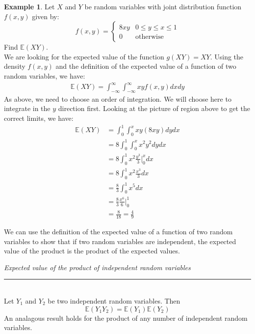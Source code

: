\documentclass[12pt]{article}
\theoremstyle{definition}
\newtheorem*{example}{Example}
\theoremstyle{remark}
\def\E{{\mathbb E}}
\begin{document}
\begin{example}
Let $X$ and $Y$ be random variables with joint distribution function $f(x, y)$ given by:
\[
f(x, y) = \begin{cases} 
      8 x y  & 0 \leq y \leq x \leq 1 \\
      0 & \textrm{otherwise}
   \end{cases}
\]
Find $\E(XY)$.\\

We are looking for the expected value of the function $g(XY) = XY$. Using the density $f(x, y)$ and the definition of the expected value of a function of two random variables, we have:
\begin{align*}
\E(XY) = \int_{-\infty}^\infty \int_{-\infty}^\infty x y f(x, y) dx dy
\end{align*}
As above, we need to choose an order of integration. We will choose here to integrate in the $y$ direction first. Looking at the picture of region above to get the correct limits, we have:
\begin{align*}
\E(XY) &= \int_0^1 \int_0^x x y (8 x y) dy dx \\
&= 8 \int_0^1 \int_0^x x^2 y^2 dy dx \\
&= 8 \int_0^1 x^2 \frac{y^3}{3}\Bigr|_0^x dx \\
&= 8 \int_0^1 x^2 \frac{x^3}{3} dx \\
&= \frac{8}{3} \int_0^1 x^5 dx \\
&= \frac{8}{3} \frac{x^6}{6} \Bigr|_0^1 \\
&= \frac{8}{18} = \frac{4}{9}
\end{align*}
\end{example}

We can use the definition of the expected value of a function of two random variables to show that if two random variables are independent, the expected value of the product is the product of the expected values.

\begin{framed}
  \emph{Expected value of the product of independent random variables}\\
  \rule{\dimexpr{}\fboxrule}{.1pt} \\
Let $Y_1$ and $Y_2$ be two independent random variables. Then
\[
\E(Y_1 Y_2) = \E(Y_1) \E(Y_2)
\]
An analagous result holds for the product of any number of independent random variables.
\end{framed}
\end{document}

